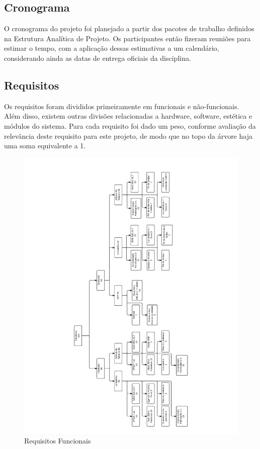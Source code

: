 	\subsection{Cronograma}\label{subsec-cronograma}
	
	O cronograma do projeto foi planejado a partir dos pacotes de trabalho definidos na Estrutura Analítica de Projeto. Os participantes então fizeram reuniões para estimar o tempo, com a aplicação dessas estimativas a um calendário, considerando ainda as datas de entrega oficiais da disciplina.
	
	\subsection{Requisitos}\label{subsec-requisitos}
	
	Os requisitos foram divididos primeiramente em funcionais e não-funcionais. Além disso, existem outras divisões relacionadas a hardware, software, estética e módulos do sistema. Para cada requisito foi dado um peso, conforme avaliação da relevância deste requisito para este projeto, de modo que no topo da árvore haja uma soma equivalente a 1.
	
	\begin{figure}[h!]
		\caption{\label{fig_req1} Requisitos Funcionais }
		\centering
		\includegraphics[width=1.0\textwidth, trim={1cm 1cm 1cm 1cm}, clip]{ReqTree1.pdf}
	\end{figure}
	
